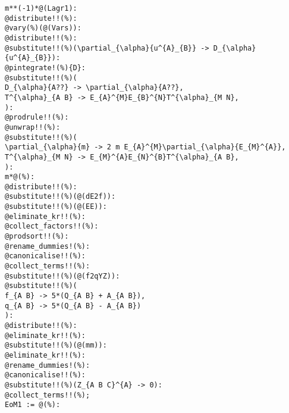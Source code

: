\documentclass[11pt]{article}
\begin{document}
{\color[named]{Blue}\begin{verbatim}
m**(-1)*@(Lagr1):
@distribute!!(%):
@vary(%)(@(Vars)):
@distribute!!(%):
@substitute!!(%)(\partial_{\alpha}{u^{A}_{B}} -> D_{\alpha}{u^{A}_{B}}):
@pintegrate!(%){D}:
@substitute!!(%)(
D_{\alpha}{A??} -> \partial_{\alpha}{A??},
T^{\alpha}_{A B} -> E_{A}^{M}E_{B}^{N}T^{\alpha}_{M N},
):
@prodrule!!(%):
@unwrap!!(%):
@substitute!!(%)(
\partial_{\alpha}{m} -> 2 m E_{A}^{M}\partial_{\alpha}{E_{M}^{A}},
T^{\alpha}_{M N} -> E_{M}^{A}E_{N}^{B}T^{\alpha}_{A B},
):
m*@(%):
@distribute!!(%):
@substitute!!(%)(@(dE2f)):
@substitute!!(%)(@(EE)):
@eliminate_kr!!(%):
@collect_factors!!(%):
@prodsort!!(%):
@rename_dummies!(%):
@canonicalise!!(%):
@collect_terms!!(%):
@substitute!!(%)(@(f2qYZ)):
@substitute!!(%)(
f_{A B} -> 5*(Q_{A B} + A_{A B}),
q_{A B} -> 5*(Q_{A B} - A_{A B})
):
@distribute!!(%):
@eliminate_kr!!(%):
@substitute!!(%)(@(mm)):
@eliminate_kr!!(%):
@rename_dummies!(%):
@canonicalise!!(%):
@substitute!!(%)(Z_{A B C}^{A} -> 0):
@collect_terms!!(%);
EoM1 := @(%):
\end{verbatim}}
\end{document}

